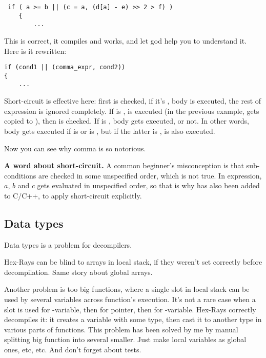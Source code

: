 \begin{lstlisting}
 if ( a >= b || (c = a, (d[a] - e) >> 2 > f) )
    {
    	...
\end{lstlisting}

This is correct, it compiles and works, and let god help you to understand it.
Here is it rewritten:

\begin{lstlisting}
if (cond1 || (comma_expr, cond2))
{
	...
\end{lstlisting}

Short-circuit is effective here: first  is checked, if it's ,  body is executed, the rest
of  expression is ignored completely.
If  is ,  is executed (in the previous example,  gets copied to ),
then  is checked.
If  is ,  body gets executed, or not.
In other words,  body gets executed if  is  or  is ,
but if the latter is ,  is also executed.

Now you can see why comma is so notorious.

\textbf{A word about short-circuit.}
A common beginner's misconception is that sub-conditions are checked in some unspecified order, which is not true.
In  expression, $a$, $b$ and $c$ gets evaluated in unspecified order, so that is why \TT{||} has also been
added to C/C++, to apply short-circuit explicitly.

\subsection{Data types}

Data types is a problem for decompilers.

Hex-Rays can be blind to arrays in local stack, if they weren't set correctly before decompilation.
Same story about global arrays.

Another problem is too big functions, where a single slot in local stack can be used by several variables
across function's execution.
It's not a rare case when a slot is used for -variable, then for pointer, then for -variable.
Hex-Rays correctly decompiles it: it creates a variable with some type, then cast it to another type in various
parts of functions.
This problem has been solved by me by manual splitting big function into several smaller.
Just make local variables as global ones, etc, etc.
And don't forget about tests.

